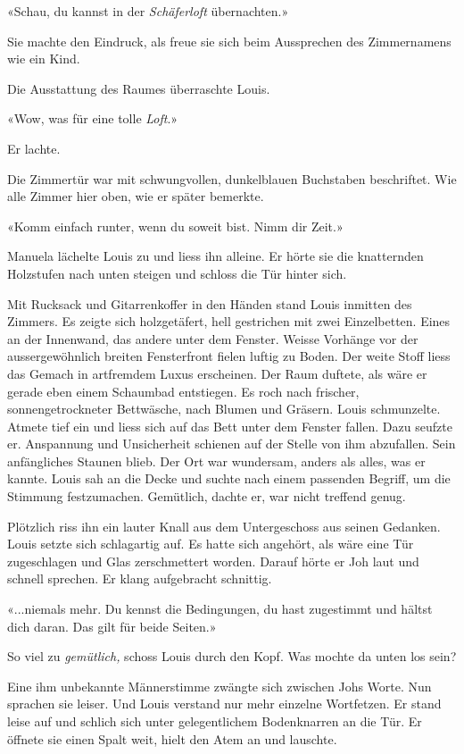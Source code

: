 «Schau, du kannst in der \emph{Schäferloft} übernachten.»

Sie machte den Eindruck, als freue sie sich beim Aussprechen des
Zimmernamens wie ein Kind.

Die Ausstattung des Raumes überraschte Louis.

«Wow, was für eine tolle \emph{Loft}.»

Er lachte.

Die Zimmertür war mit schwungvollen, dunkelblauen Buchstaben
beschriftet. Wie alle Zimmer hier oben, wie er später bemerkte.

«Komm einfach runter, wenn du soweit bist. Nimm dir Zeit.»

Manuela lächelte Louis zu und liess ihn alleine. Er hörte sie die
knatternden Holzstufen nach unten steigen und schloss die Tür hinter
sich.

Mit Rucksack und Gitarrenkoffer in den Händen stand Louis inmitten des
Zimmers. Es zeigte sich holzgetäfert, hell gestrichen mit zwei
Einzelbetten. Eines an der Innenwand, das andere unter dem Fenster.
Weisse Vorhänge vor der aussergewöhnlich breiten Fensterfront fielen
luftig zu Boden. Der weite Stoff liess das Gemach in artfremdem Luxus
erscheinen. Der Raum duftete, als wäre er gerade eben einem Schaumbad
entstiegen. Es roch nach frischer, sonnengetrockneter Bettwäsche, nach
Blumen und Gräsern. Louis schmunzelte. Atmete tief ein und liess sich
auf das Bett unter dem Fenster fallen. Dazu seufzte er. Anspannung und
Unsicherheit schienen auf der Stelle von ihm abzufallen. Sein
anfängliches Staunen blieb. Der Ort war wundersam, anders als alles, was
er kannte. Louis sah an die Decke und suchte nach einem passenden
Begriff, um die Stimmung festzumachen. Gemütlich, dachte er, war nicht
treffend genug.

Plötzlich riss ihn ein lauter Knall aus dem Untergeschoss aus seinen
Gedanken. Louis setzte sich schlagartig auf. Es hatte sich angehört, als
wäre eine Tür zugeschlagen und Glas zerschmettert worden. Darauf hörte
er Joh laut und schnell sprechen. Er klang aufgebracht schnittig.

«...niemals mehr. Du kennst die Bedingungen, du hast zugestimmt und
hältst dich daran. Das gilt für beide Seiten.»

So viel zu \emph{gemütlich,} schoss Louis durch den Kopf. Was mochte da
unten los sein?

Eine ihm unbekannte Männerstimme zwängte sich zwischen Johs Worte. Nun
sprachen sie leiser. Und Louis verstand nur mehr einzelne Wortfetzen. Er
stand leise auf und schlich sich unter gelegentlichem Bodenknarren an
die Tür. Er öffnete sie einen Spalt weit, hielt den Atem an und
lauschte.

